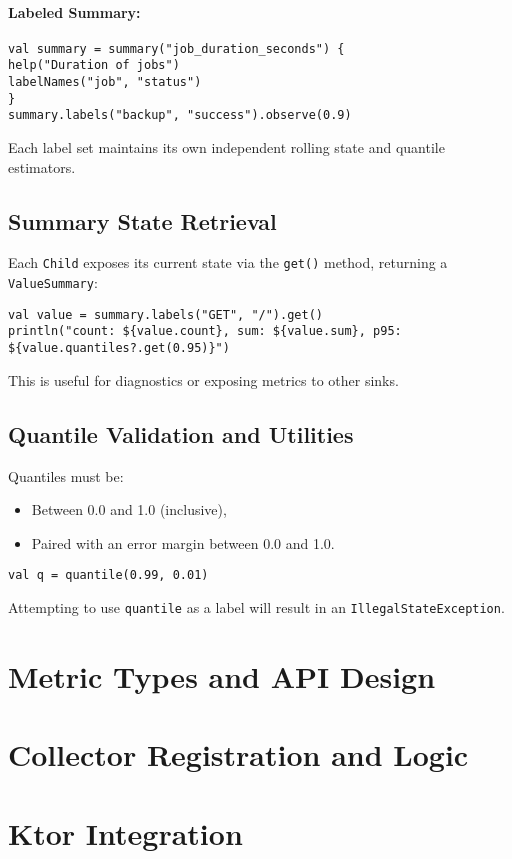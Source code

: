 \paragraph{Labeled Summary:}
\begin{verbatim}
val summary = summary("job_duration_seconds") {
help("Duration of jobs")
labelNames("job", "status")
}
summary.labels("backup", "success").observe(0.9)
\end{verbatim}

Each label set maintains its own independent rolling state and quantile estimators.

\subsection{Summary State Retrieval}

Each \texttt{Child} exposes its current state via the \texttt{get()} method, returning a \texttt{ValueSummary}:

\begin{verbatim}
val value = summary.labels("GET", "/").get()
println("count: ${value.count}, sum: ${value.sum}, p95: ${value.quantiles?.get(0.95)}")
\end{verbatim}

This is useful for diagnostics or exposing metrics to other sinks.

\subsection{Quantile Validation and Utilities}

Quantiles must be:
\begin{itemize}
\item Between 0.0 and 1.0 (inclusive),
\item Paired with an error margin between 0.0 and 1.0.
\end{itemize}

\begin{verbatim}
val q = quantile(0.99, 0.01)
\end{verbatim}

Attempting to use \texttt{quantile} as a label will result in an \texttt{IllegalStateException}.





\section{Metric Types and API Design}
\lipsum[1]


\section{Collector Registration and Logic}
\lipsum[1]


\section{Ktor Integration}
\lipsum[1]
